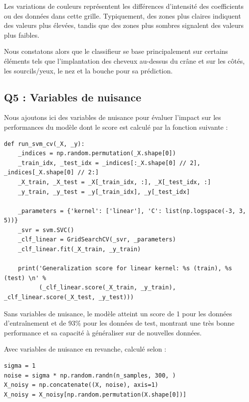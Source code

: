 \documentclass{scrartcl}
\begin{document}
Les variations de couleurs représentent les différences d'intensité des coefficients ou des données dans cette grille. Typiquement, des zones plus claires indiquent des valeurs plus élevées, tandis que des zones plus sombres signalent des valeurs plus faibles.\newline

Nous constatons alors que le classifieur se base principalement sur certains éléments tels que l'implantation des cheveux au-dessus du crâne et sur les côtés, les sourcils/yeux, le nez et la bouche pour sa prédiction.

\subsection{Q5 : Variables de nuisance}
\hspace{7pt} Nous ajoutons ici des variables de nuisance pour évaluer l'impact sur les performances du modèle dont le score est calculé par la fonction suivante :\newline
\begin{lstlisting}
def run_svm_cv(_X, _y):
    _indices = np.random.permutation(_X.shape[0])
    _train_idx, _test_idx = _indices[:_X.shape[0] // 2], _indices[_X.shape[0] // 2:]
    _X_train, _X_test = _X[_train_idx, :], _X[_test_idx, :]
    _y_train, _y_test = _y[_train_idx], _y[_test_idx]

    _parameters = {'kernel': ['linear'], 'C': list(np.logspace(-3, 3, 5))}
    _svr = svm.SVC()
    _clf_linear = GridSearchCV(_svr, _parameters)
    _clf_linear.fit(_X_train, _y_train)

    print('Generalization score for linear kernel: %s (train), %s (test) \n' %
          (_clf_linear.score(_X_train, _y_train), _clf_linear.score(_X_test, _y_test)))
\end{lstlisting}

Sans variables de nuisance, le modèle atteint un score de 1 pour les données d'entraînement et de 93\% pour les données de test, montrant une très bonne performance et sa capacité à généraliser sur de nouvelles données.\newline

Avec variables de nuisance en revanche, calculé selon :

\begin{lstlisting}
sigma = 1
noise = sigma * np.random.randn(n_samples, 300, )
X_noisy = np.concatenate((X, noise), axis=1)
X_noisy = X_noisy[np.random.permutation(X.shape[0])]
\end{lstlisting}
\end{document}
